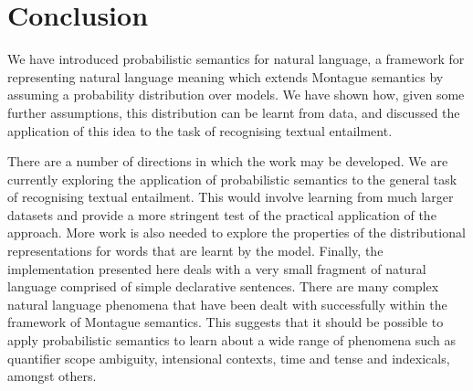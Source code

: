 \documentclass[letterpaper]{article}
\begin{document}
\section{Conclusion}

We have introduced probabilistic semantics for natural language, a
framework for representing natural language meaning which extends
Montague semantics by assuming a probability distribution over
models. We have shown how, given some further assumptions, this
distribution can be learnt from data, and discussed the application of
this idea to the task of recognising textual entailment. 

There are a number of directions in which the work may be developed. We are currently  exploring the application of probabilistic semantics to the general task of recognising textual entailment. This would involve learning from much larger datasets and provide a more stringent test of the practical application of the approach. More work is also needed to explore the properties of the distributional representations for words that are learnt by the model. Finally, the implementation presented here deals with a very small fragment of natural language comprised of simple declarative sentences. There are many complex natural language phenomena that have been dealt with successfully within the framework of Montague semantics. This suggests that it should be possible to apply probabilistic semantics to learn about a wide range of phenomena such as quantifier scope ambiguity, intensional contexts, time and tense and indexicals, amongst others. 




\end{document}
